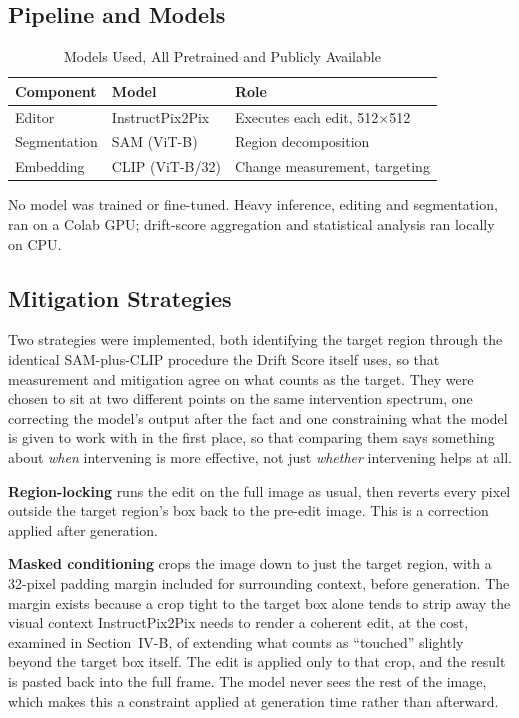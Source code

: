 \subsection{Pipeline and Models}
\begin{table}[H]
\caption{Models Used, All Pretrained and Publicly Available}
\label{tab:models}
\centering
\small
\renewcommand{\arraystretch}{1.0}
\begin{tabular}{@{}lll@{}}
\toprule
Component & Model & Role \\
\midrule
Editor & InstructPix2Pix & Executes each edit, 512$\times$512 \\
Segmentation & SAM (ViT-B) & Region decomposition \\
Embedding & CLIP (ViT-B/32) & Change measurement, targeting \\
\bottomrule
\end{tabular}
\end{table}
No model was trained or fine-tuned. Heavy inference, editing and segmentation, ran on a Colab GPU; drift-score aggregation and statistical analysis ran locally on CPU.

\subsection{Mitigation Strategies}
Two strategies were implemented, both identifying the target region through the identical SAM-plus-CLIP procedure the Drift Score itself uses, so that measurement and mitigation agree on what counts as the target. They were chosen to sit at two different points on the same intervention spectrum, one correcting the model's output after the fact and one constraining what the model is given to work with in the first place, so that comparing them says something about \emph{when} intervening is more effective, not just \emph{whether} intervening helps at all.

\textbf{Region-locking} runs the edit on the full image as usual, then reverts every pixel outside the target region's box back to the pre-edit image. This is a correction applied after generation.

\textbf{Masked conditioning} crops the image down to just the target region, with a 32-pixel padding margin included for surrounding context, before generation. The margin exists because a crop tight to the target box alone tends to strip away the visual context InstructPix2Pix needs to render a coherent edit, at the cost, examined in Section~IV-B, of extending what counts as ``touched'' slightly beyond the target box itself. The edit is applied only to that crop, and the result is pasted back into the full frame. The model never sees the rest of the image, which makes this a constraint applied at generation time rather than afterward.

